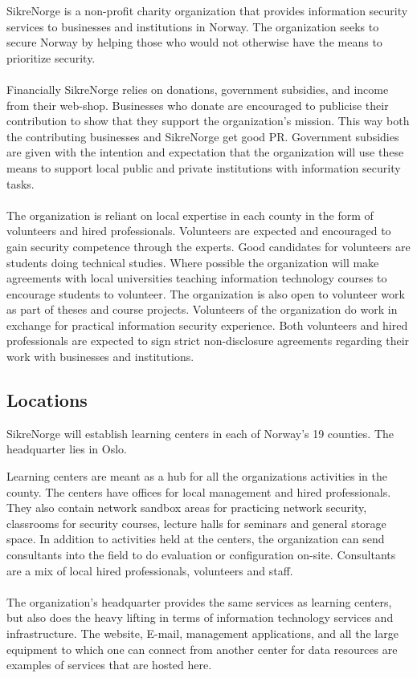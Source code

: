 SikreNorge is a non-profit charity organization that provides information security services to businesses and institutions in Norway. The organization seeks to secure Norway by helping those who would not otherwise have the means to prioritize security.
\\
\\
Financially SikreNorge relies on donations, government subsidies, and income from their web-shop. Businesses who donate are encouraged to publicise their contribution to show that they support the organization's mission. This way both the contributing businesses and SikreNorge get good PR. Government subsidies are given with the intention and expectation that the organization will use these means to support local public and private institutions with information security tasks.
\\
\\
The organization is reliant on local expertise in each county in the form of volunteers and hired professionals. Volunteers are expected and encouraged to gain security competence through the experts. Good candidates for volunteers are students doing technical studies. Where possible the organization will make agreements with local universities teaching information technology courses to encourage students to volunteer. The organization is also open to volunteer work as part of theses and course projects. Volunteers of the organization do work in exchange for practical information security experience. Both volunteers and hired professionals are expected to sign strict non-disclosure agreements regarding their work with businesses and institutions.

\subsection{Locations}

SikreNorge will establish learning centers in each of Norway's 19 counties. The headquarter lies in Oslo.

Learning centers are meant as a hub for all the organizations activities in the county. The centers have offices for local management and hired professionals. They also contain network sandbox areas for practicing network security, classrooms for security courses, lecture halls for seminars and general storage space. In addition to activities held at the centers, the organization can send consultants into the field to do evaluation or configuration on-site. Consultants are a mix of local hired professionals, volunteers and staff.
\\
\\
The organization's headquarter provides the same services as learning centers, but also does the heavy lifting in terms of information technology services and infrastructure. The website, E-mail, management applications, and all the large equipment to which one can connect from another center for data resources are examples of services that are hosted here.

